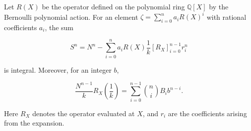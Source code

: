 Let $R(X)$ be the operator defined on the polynomial ring $\mathbb{Q}[X]$ by the Bernoulli polynomial action. For an element $\zeta = \sum_{i=0}^{n} a_i R(X)^i$ with rational coefficients $a_i$, the sum

$$
S^n = N^n - \sum_{i=0}^{n} a_i R(X) \frac{1}{k}[R_X]_{i=0}^{n-1} r_i^n
$$

is integral. Moreover, for an integer $b$,

$$
\frac{N^{n-1}}{k} R_X\!\left(\frac{1}{k}\right) = \sum_{i=0}^{n-1} \binom{n}{i} B_i b^{n-i}.
$$

Here $R_X$ denotes the operator evaluated at $X$, and $r_i$ are the coefficients arising from the expansion.
